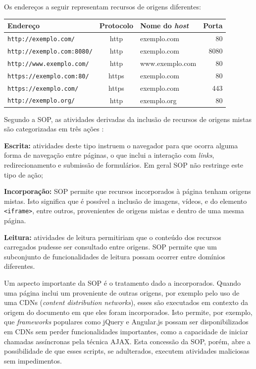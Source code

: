 Os endereços a seguir representam recursos de origens diferentes:

{\small
	\begin{tabular}{|l|c|l|r|}
		\hline 
		Endereço & Protocolo & Nome do \textit{host} & Porta \\ 
		\hline 
		\texttt{http://exemplo.com/} & http & exemplo.com & 80 \\ 
		\hline 
		\texttt{http://exemplo.com:8080/} & http & exemplo.com & 8080 \\ 
		\hline 
		\texttt{http://www.exemplo.com/} & http & www.exemplo.com & 80 \\ 
		\hline 
		\texttt{https://exemplo.com:80/} & https & exemplo.com & 80 \\ 
		\hline
		\texttt{https://exemplo.com/} & https & exemplo.com & 443 \\ 
		\hline
		\texttt{http://exemplo.org/} & http & exemplo.org & 80 \\ 
		\hline
	\end{tabular}
}

Segundo a SOP, as atividades derivadas da inclusão de recursos de origens mistas são categorizadas em três ações \cite{Ruderman2017}:

\begin{alineas}
	\item \textbf{Escrita:} atividades deste tipo instruem o navegador para que ocorra alguma forma de navegação entre páginas, o que inclui a interação com \textit{links}, redirecionamento e submissão de formulários. Em geral SOP não restringe este tipo de ação;
	\item \textbf{Incorporação:} SOP permite que recursos incorporados à página tenham origens mistas. Isto significa que é possível a inclusão de imagens, vídeos, \scripts e do elemento \texttt{<iframe>}, entre outros, provenientes de origens mistas e dentro de uma mesma página.
	\item \textbf{Leitura:} atividades de leitura permitiriam que o conteúdo dos recursos carregados pudesse ser consultado entre origens. SOP permite que um subconjunto de funcionalidades de leitura possam ocorrer entre domínios diferentes.
\end{alineas}

Um aspecto importante da SOP é o tratamento dado a \scripts incorporados. Quando uma página inclui um \script proveniente de outras origens, por exemplo pelo uso de uma CDNs (\textit{content distribution networks}), esses \scripts são executados em contexto da origem do documento em que eles foram incorporados. Isto permite, por exemplo, que \textit{frameworks} populares como jQuery e Angular.js possam ser disponibilizados em CDNs sem perder funcionalidades importantes, como a capacidade de iniciar chamadas assíncronas pela técnica AJAX. Esta concessão da SOP, porém, abre a possibilidade de que esses scripts, se adulterados, executem atividades maliciosas sem impedimentos.

